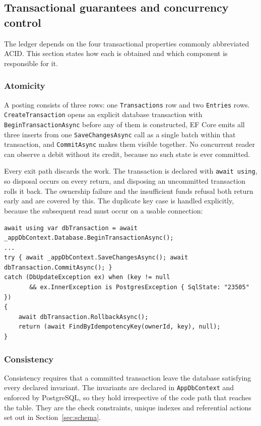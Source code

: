 \documentclass[11pt,a4paper]{article}
\newcommand{\code}[1]{\texttt{\fontsize{8.6}{10}\selectfont #1}}
\begin{document}
\subsection{Transactional guarantees and concurrency control}\label{sec:acid}

The ledger depends on the four transactional properties commonly abbreviated
ACID. This section states how each is obtained and which component is
responsible for it.

\subsubsection*{Atomicity}

A posting consists of three rows: one \code{Transactions} row and two
\code{Entries} rows. \code{CreateTransaction} opens an explicit database
transaction with \code{BeginTransactionAsync} before any of them is constructed,
EF Core emits all three inserts from one \code{SaveChangesAsync} call as a
single batch within that transaction, and \code{CommitAsync} makes them visible
together. No concurrent reader can observe a debit without its credit, because
no such state is ever committed.

Every exit path discards the work. The transaction is declared with
\code{await using}, so disposal occurs on every return, and disposing an
uncommitted transaction rolls it back. The ownership failure and the
insufficient funds refusal both return early and are covered by this. The
duplicate key case is handled explicitly, because the subsequent read must
occur on a usable connection:

\begin{lstlisting}
await using var dbTransaction = await _appDbContext.Database.BeginTransactionAsync();
...
try { await _appDbContext.SaveChangesAsync(); await dbTransaction.CommitAsync(); }
catch (DbUpdateException ex) when (key != null
       && ex.InnerException is PostgresException { SqlState: "23505" })
{
    await dbTransaction.RollbackAsync();
    return (await FindByIdempotencyKey(ownerId, key), null);
}
\end{lstlisting}

\subsubsection*{Consistency}

Consistency requires that a committed transaction leave the database satisfying
every declared invariant. The invariants are declared in \code{AppDbContext}
and enforced by PostgreSQL, so they hold irrespective of the code path that
reaches the table. They are the check constraints, unique indexes and
referential actions set out in Section~\ref{sec:schema}.
\end{document}
